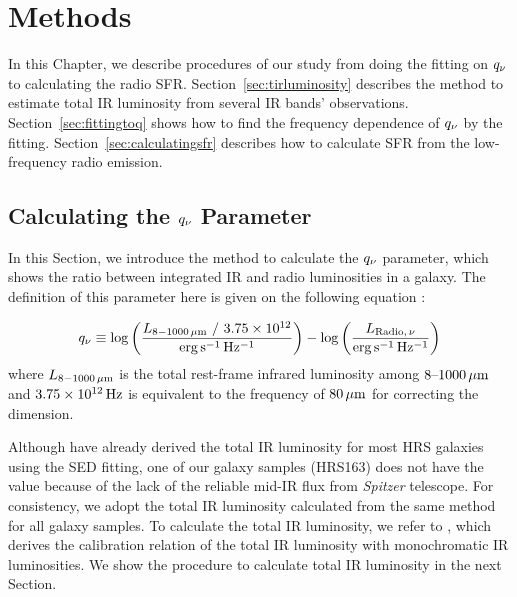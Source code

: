 \chapter{Methods}\label{chap:methods}
\begin{chapabstract}

In this Chapter, we describe procedures of our study from doing the fitting on $q_{\nu}$ to calculating the radio SFR\@.
Section~\ref{sec:tirluminosity} describes the method to estimate total IR luminosity from several IR bands' observations.
Section~\ref{sec:fittingtoq} shows how to find the frequency dependence of $q_{\nu}$ by the fitting.
Section~\ref{sec:calculatingsfr} describes how to calculate SFR from the low-frequency radio emission.

\end{chapabstract}

\section{Calculating the $q_{\nu}$ Parameter}\label{sec:calculatingq}
In this Section, we introduce the method to calculate the $q_{\nu}$ parameter, which shows the ratio between integrated IR and radio luminosities in a galaxy.
The definition of this parameter here is given on the following equation \citep[e.g.,][]{Helou1985, Bell2003, CalistroRivera2017a}:

\begin{equation}\label{eq:q_def}
    q_{\nu} \equiv \log\left(\frac{L_{\mathrm{8-1000\,\mu m}}\ /\ 3.75 \times 10^{12}}{{\rm erg\,s^{-1}\,Hz^{-1}}}\right) - \log\left(\frac{L_{\mathrm{Radio},\,\nu}}{{\rm erg\,s^{-1}\,Hz^{-1}}}\right)
\end{equation}
where $L_{\mathrm{8-1000\,\mu m}}$ is the total rest-frame infrared luminosity among $8 \mbox{--} 1000\,\mathrm{\mu m}$ and $3.75\times10^{12}\,\mathrm{Hz}$ is equivalent to the frequency of $80\,\mathrm{\mu m}$ for correcting the dimension.

Although \citet{Ciesla2014} have already derived the total IR luminosity for most HRS galaxies using the SED fitting, one of our galaxy samples (HRS163) does not have the value because of the lack of the reliable mid-IR flux from {\it Spitzer\/} telescope.
For consistency, we adopt the total IR luminosity calculated from the same method for all galaxy samples.
To calculate the total IR luminosity, we refer to \citet{Galametz2013}, which derives the calibration relation of the total IR luminosity with monochromatic IR luminosities.
We show the procedure to calculate total IR luminosity in the next Section.



